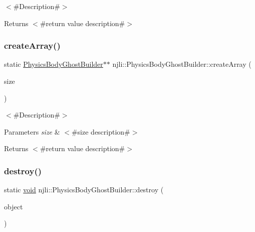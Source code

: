 $<$\#\+Description\#$>$

\begin{DoxyReturn}{Returns}
$<$\#return value description\#$>$ 
\end{DoxyReturn}
\mbox{\label{classnjli_1_1_physics_body_ghost_builder_a96ba3bbcc01126adbd3e4d53a554b151}} 
\subsubsection{\texorpdfstring{create\+Array()}{createArray()}}
{\footnotesize\ttfamily static \mbox{\hyperlink{classnjli_1_1_physics_body_ghost_builder}{Physics\+Body\+Ghost\+Builder}}$\ast$$\ast$ njli\+::\+Physics\+Body\+Ghost\+Builder\+::create\+Array (\begin{DoxyParamCaption}\item[{const \mbox{\hyperlink{_util_8h_a10e94b422ef0c20dcdec20d31a1f5049}{u32}}}]{size }\end{DoxyParamCaption})\hspace{0.3cm}{\ttfamily [static]}}

$<$\#\+Description\#$>$


\begin{DoxyParams}{Parameters}
{\em size} & $<$\#size description\#$>$\\
\hline
\end{DoxyParams}
\begin{DoxyReturn}{Returns}
$<$\#return value description\#$>$ 
\end{DoxyReturn}
\mbox{\label{classnjli_1_1_physics_body_ghost_builder_a652cdb55fc9c23ea1ec55fb8d58b0036}} 
\subsubsection{\texorpdfstring{destroy()}{destroy()}}
{\footnotesize\ttfamily static \mbox{\hyperlink{_thread_8h_af1e856da2e658414cb2456cb6f7ebc66}{void}} njli\+::\+Physics\+Body\+Ghost\+Builder\+::destroy (\begin{DoxyParamCaption}\item[{\mbox{\hyperlink{classnjli_1_1_physics_body_ghost_builder}{Physics\+Body\+Ghost\+Builder}} $\ast$}]{object }\end{DoxyParamCaption})\hspace{0.3cm}{\ttfamily [static]}}

